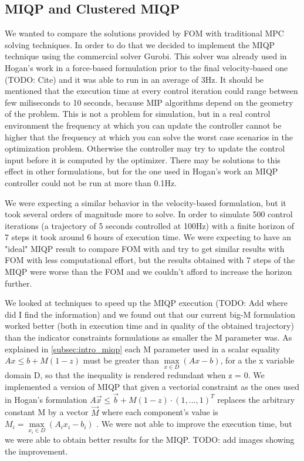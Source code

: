 \documentclass[12,twoside]{TFG-GM}
\theoremstyle{definition}
\theoremstyle{remark}
\begin{document}
\subsection{MIQP and Clustered MIQP}
\label{subsec:miqp}

We wanted to compare the solutions provided by FOM with traditional MPC solving techniques. In order to do that we decided to implement the MIQP technique using the commercial solver Gurobi. This solver was already used in Hogan's work in a force-based formulation prior to the final velocity-based one (TODO: Cite) and it was able to run in an average of 3Hz. It should be mentioned that the execution time at every control iteration could range between few miliseconds to 10 seconds, because MIP algorithms depend on the geometry of the problem.
This is not a problem for simulation, but in a real control environment the frequency at which you can update the controller cannot be higher that the frequency at which you can solve the worst case scenarios in the optimization problem. Otherwise the controller may try to update the control input before it is computed by the optimizer. There may be solutions to this effect in other formulations, but for the one used in Hogan's work an MIQP controller could not be run at more than 0.1Hz.

We were expecting a similar behavior in the velocity-based formulation, but it took several orders of magnitude more to solve. In order to simulate 500 control iterations (a trajectory of 5 seconds controlled at 100Hz) with a finite horizon of 7 steps it took around 6 hours of execution time. We were expecting to have an "ideal" MIQP result to compare FOM with and try to get similar results with FOM with less computational effort, but the results obtained with 7 steps of the MIQP were worse than the FOM and we couldn't afford to increase the horizon further.

We looked at techniques to speed up the MIQP execution (TODO: Add where did I find the information) and we found out that our current big-M formulation worked better (both in execution time and in quality of the obtained trajectory) than the indicator constraints formulations as smaller the M parameter was. As explained in \ref{subsec:intro_miqp} each M parameter used in a scalar equality $Ax \leq b + M (1 - z)$ must be greater than $\max\limits_{x \in D}{(Ax - b)}$, for a the x variable domain D, so that the inequality is rendered redundant when z = 0. We implemented a version of MIQP that given a vectorial constraint as the ones used in Hogan's formulation $A\vec{x} \leq \vec{b} + M (1 - z) \cdot (1, ..., 1)^T$ replaces the arbitrary constant M by a vector $\vec{M}$ where each component's value is $M_i = \max\limits_{x_i \in D}{(A_i x_i - b_i)}$
. We were not able to improve the execution time, but we were able to obtain better results for the MIQP. TODO: add images showing the improvement.
\end{document}

